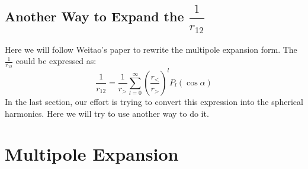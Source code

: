 \subsection{Another Way to Expand the $\dfrac{1}{r_{12}}$}
%
%
%
Here we will follow Weitao's paper to rewrite the multipole expansion form.
The $\frac{1}{r_{12}}$ could be expressed as:
\begin{equation}
\frac{1}{r_{12}} = \frac{1}{r_{>}}\sum_{l=0}^{\infty}
\left( \frac{r_{<}}{r_{>}}\right)^{l} P_{l}(\cos \alpha)
\end{equation}
In the last section, our effort is trying to convert this expression into
the spherical harmonics. Here we will try to use another way to do it.




\section{Multipole Expansion}
%
%




